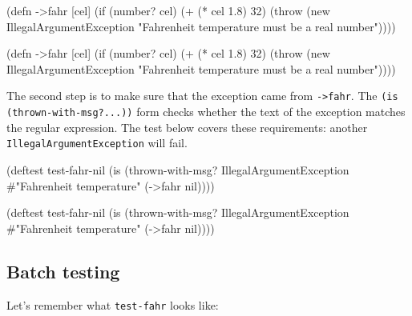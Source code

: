 \ifx\DEVICETYPE\MOBILE

\begin{english}
  \begin{clojure}
(defn ->fahr [cel]
  (if (number? cel)
    (+ (* cel 1.8) 32)
    (throw (new IllegalArgumentException
             "Fahrenheit temperature
              must be a real number"))))
  \end{clojure}
\end{english}

\else

\begin{english}
  \begin{clojure}
(defn ->fahr [cel]
  (if (number? cel)
    (+ (* cel 1.8) 32)
    (throw (new IllegalArgumentException
            "Fahrenheit temperature must be a real number"))))
  \end{clojure}
\end{english}

\fi

The second step is to make sure that the exception came from \verb|->fahr|. The \texttt{(is (thrown\--with-msg?...))} form checks whether the text of the exception matches the regular expression. The test below covers these requirements: another \verb|IllegalArgumentException| will fail.

\ifx\DEVICETYPE\MOBILE

\begin{english}
  \begin{clojure}
(deftest test-fahr-nil
  (is (thrown-with-msg?
       IllegalArgumentException
       #"Fahrenheit temperature"
       (->fahr nil))))
  \end{clojure}
\end{english}

\else

\begin{english}
  \begin{clojure}
(deftest test-fahr-nil
  (is (thrown-with-msg?
       IllegalArgumentException #"Fahrenheit temperature"
       (->fahr nil))))
  \end{clojure}
\end{english}

\fi

\subsection{Batch testing}

Let's remember what \verb|test-fahr| looks like:

